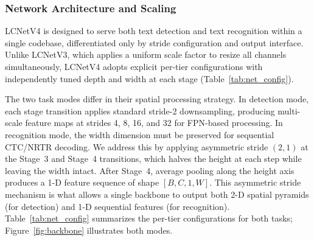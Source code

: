 \documentclass[11pt, a4paper,logo,  copyright, nonumbering]{paddleocr}
\begin{document}
\subsubsection{Network Architecture and Scaling}

LCNetV4 is designed to serve both text detection and text recognition within a single codebase, differentiated only by stride configuration and output interface. Unlike LCNetV3, which applies a uniform scale factor to resize all channels simultaneously, LCNetV4 adopts explicit per-tier configurations with independently tuned depth and width at each stage (Table~\ref{tab:net_config}).

The two task modes differ in their spatial processing strategy. In detection mode, each stage transition applies standard stride-2 downsampling, producing multi-scale feature maps at strides 4, 8, 16, and 32 for FPN-based processing. In recognition mode, the width dimension must be preserved for sequential CTC/NRTR decoding. We address this by applying asymmetric stride $(2,1)$ at the Stage~3 and Stage~4 transitions, which halves the height at each step while leaving the width intact. After Stage~4, average pooling along the height axis produces a 1-D feature sequence of shape $[B, C, 1, W]$. This asymmetric stride mechanism is what allows a single backbone to output both 2-D spatial pyramids (for detection) and 1-D sequential features (for recognition). Table~\ref{tab:net_config} summarizes the per-tier configurations for both tasks; Figure~\ref{fig:backbone} illustrates both modes.
\end{document}

